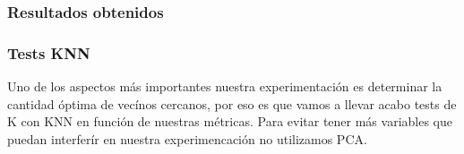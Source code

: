 \subsubsection*{Resultados obtenidos}

\subsubsection*{Tests KNN}

Uno de los aspectos más importantes nuestra experimentación es determinar la cantidad óptima de vecínos cercanos, por eso es que vamos a llevar acabo tests de K con KNN en función de nuestras métricas. Para evitar tener más variables que puedan interferír en nuestra experimencación no utilizamos PCA.



